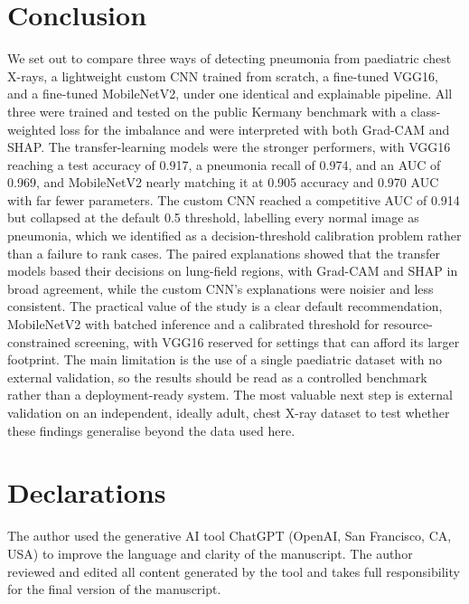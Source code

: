 \documentclass[preprint,12pt]{elsarticle}
\begin{document}
\section{Conclusion}
We set out to compare three ways of detecting pneumonia from paediatric chest X-rays, a lightweight custom CNN trained from scratch, a fine-tuned VGG16, and a fine-tuned MobileNetV2, under one identical and explainable pipeline.
All three were trained and tested on the public Kermany benchmark with a class-weighted loss for the imbalance and were interpreted with both Grad-CAM and SHAP.
The transfer-learning models were the stronger performers, with VGG16 reaching a test accuracy of 0.917, a pneumonia recall of 0.974, and an AUC of 0.969, and MobileNetV2 nearly matching it at 0.905 accuracy and 0.970 AUC with far fewer parameters.
The custom CNN reached a competitive AUC of 0.914 but collapsed at the default 0.5 threshold, labelling every normal image as pneumonia, which we identified as a decision-threshold calibration problem rather than a failure to rank cases.
The paired explanations showed that the transfer models based their decisions on lung-field regions, with Grad-CAM and SHAP in broad agreement, while the custom CNN's explanations were noisier and less consistent.
The practical value of the study is a clear default recommendation, MobileNetV2 with batched inference and a calibrated threshold for resource-constrained screening, with VGG16 reserved for settings that can afford its larger footprint.
The main limitation is the use of a single paediatric dataset with no external validation, so the results should be read as a controlled benchmark rather than a deployment-ready system.
The most valuable next step is external validation on an independent, ideally adult, chest X-ray dataset to test whether these findings generalise beyond the data used here.

\section*{Declarations}
The author used the generative AI tool ChatGPT (OpenAI, San Francisco, CA, USA) to improve the language and clarity of the manuscript.
The author reviewed and edited all content generated by the tool and takes full responsibility for the final version of the manuscript.



\end{document}
